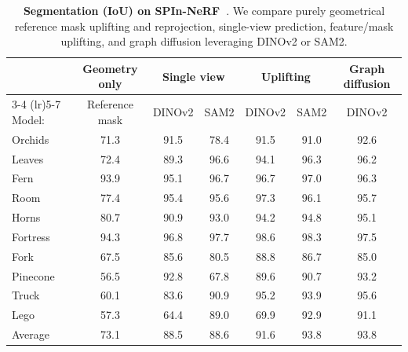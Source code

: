 \begin{table}[t!] 
\centering \footnotesize 
\begin{tabular}{lcccccc} 
\toprule
& Geometry only & \multicolumn{2}{c}{Single view} & \multicolumn{2}{c}{Uplifting} & \multicolumn{1}{c}{Graph diffusion} \\
\cmidrule(lr){3-4} \cmidrule(lr){5-7}
Model: & Reference mask & DINOv2 & SAM2 & DINOv2 & SAM2 & DINOv2 \\ 
\midrule 
Orchids & 71.3 & 91.5 & 78.4 & 91.5 & 91.0 & 92.6 \\ 
Leaves &  72.4 & 89.3 & 96.6 & 94.1 & 96.3 & 96.2 \\ 
Fern &  93.9 & 95.1 & 96.7 & 96.7 & 97.0 & 96.3 \\ 
Room &  77.4 & 95.4 & 95.6 & 97.3 & 96.1 & 95.7 \\ 
Horns &  80.7 & 90.9 & 93.0 & 94.2 & 94.8 & 95.1 \\ 
Fortress &  94.3 & 96.8 & 97.7 & 98.6 & 98.3 & 97.5 \\ 
\midrule 
Fork &  67.5 & 85.6 & 80.5 & 88.8 &  86.7 & 85.0 \\ 
Pinecone &  56.5 & 92.8 & 67.8 & 89.6 & 90.7 & 93.2 \\ 
Truck &  60.1 & 83.6 & 90.9 & 95.2 & 93.9 & 95.6 \\ 
Lego &  57.3 & 64.4 & 89.0 & 69.9 & 92.9 & 91.1 \\
\midrule 
Average & 73.1 & 88.5 & 88.6 & 91.6 & 93.8 & 93.8 \\
\bottomrule 
\end{tabular} 
\caption{\textbf{Segmentation (IoU) on SPIn-NeRF~\citep{mirzaei2023spin}}. We compare purely geometrical reference mask uplifting and reprojection, single-view prediction, feature/mask uplifting, and graph diffusion leveraging DINOv2 or SAM2.} \label{tab:ablation-spin-dino-sam}
\end{table}